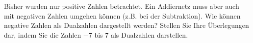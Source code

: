 \begin{exercise}
Bisher wurden nur positive Zahlen betrachtet. Ein Addiernetz muss aber auch mit negativen Zahlen umgehen können (z.B. bei der Subtraktion). Wie können negative Zahlen als Dualzahlen dargestellt werden? Stellen Sie Ihre Überlegungen dar, indem Sie die Zahlen $-7$ bis $7$ als Dualzahlen darstellen.
\end{exercise}
